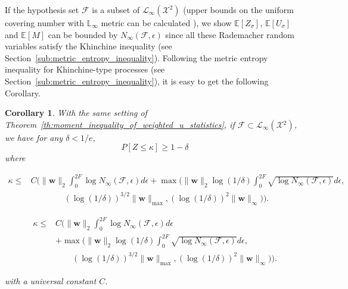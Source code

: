 \documentclass[letterpaper]{article} %
\def\DoubleColumn{}
\def\DoubleColumnEnd{}
\def\SingleColumn{}
\def\SingleColumnEnd{}
\newtheorem{corollary}{Corollary}
\newcommand{\E}{\mathbb{E}}
\newcommand{\Pro}{P}
\newcommand{\weight}{\mathbf{w}}
\newcommand{\xspace}{\mathcal{X}}
\newcommand{\rademacher}{\sigma}
\newcommand{\lnorm}{\mathbb{L}}
\newcommand{\lnormspace}{\mathscr{L}}
\newcommand{\citep}[3]{(#1\ \citeauthor{#3}\ \citeyear{#3},\ #2)}
\begin{document}
If the hypothesis set $\mathcal{F}$ is a subset of $\lnormspace{}_\infty(\xspace^2)$ (upper bounds on the uniform covering number with $\lnorm{}_\infty$ metric can be calculated \cite{cucker2007learning}), we show $\E[Z_\rademacher{}]$, $\E[U_\rademacher{}]$ and $\E[M]$ can be bounded by $N_\infty(\mathcal{F},\epsilon)$ since all these Rademacher random variables satisfy the Khinchine inequality (see Section~\ref{sub:metric_entropy_inequality}). Following the metric entropy inequality for Khinchine-type processes (see Section~\ref{sub:metric_entropy_inequality}), it is easy to get the following Corollary.

\begin{corollary}
    \label{cor:covering_number_inequality}
    With the same setting of Theorem~\ref{th:moment_inequality_of_weighted_u_statistics}, if $\mathcal{F}\subset \lnormspace{}_\infty(\xspace{}^2)$, we have for any $\delta<1/e$,
    \[\Pro[Z\le \kappa]\ge 1-\delta\]
    where 
    \SingleColumn
    \begin{align*}
        \kappa\le&C\bigg(\|\weight{}\|_2\int_0^{2F}\log N_\infty(\mathcal F, \epsilon)d\epsilon+\max\Big(\|\weight{}\|_2\log(1/\delta)\int_0^{2F}\sqrt{\log N_\infty(\mathcal F,\epsilon)}d\epsilon,\\
        &\qquad\qquad(\log(1/\delta))^{3/2}\|\weight{}\|_{\max}, (\log(1/\delta))^2\|\weight{}\|_\infty\Big)\bigg).
    \end{align*}
    \SingleColumnEnd
    \DoubleColumn
    \begin{align*}
        \kappa\le&C\bigg(\|\weight{}\|_2\int_0^{2F}\log N_\infty(\mathcal F, \epsilon)d\epsilon\\
        &+\max\Big(\|\weight{}\|_2\log(1/\delta)\int_0^{2F}\sqrt{\log N_\infty(\mathcal F,\epsilon)}d\epsilon,\\
        &\qquad(\log(1/\delta))^{3/2}\|\weight{}\|_{\max}, (\log(1/\delta))^2\|\weight{}\|_\infty\Big)\bigg).
    \end{align*}
    \DoubleColumnEnd
    with a universal constant $C$.
\end{corollary}




\end{document}
